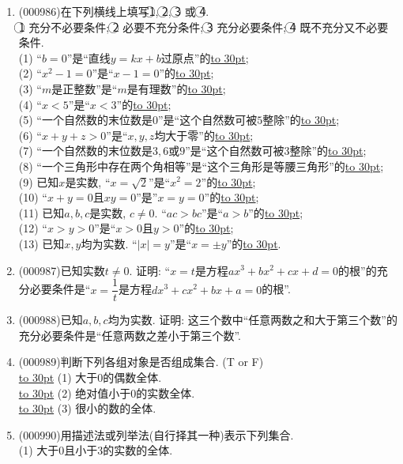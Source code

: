 \documentclass[10pt,a4paper]{article}
\newcommand{\blank}[1]{\underline{\hbox to #1pt{}}}
\begin{document}
\begin{enumerate}[1.]
逆否命题: \blank{250}; 逆否命题的真值: \blank{30}.
\item {\tiny (000986)}在下列横线上填写\textcircled{1}, \textcircled{2}, \textcircled{3} 或 \textcircled{4}.\\ 
\textcircled{1} 充分不必要条件; \textcircled{2} 必要不充分条件; \textcircled{3} 充分必要条件; \textcircled{4} 既不充分又不必要条件.\\ 
(1) ``$b=0$''是``直线$y=kx+b$过原点''的\blank{30};\\ 
(2) ``$x^2-1=0$''是``$x-1=0$''的\blank{30};\\ 
(3) ``$m$是正整数''是``$m$是有理数''的\blank{30};\\ 
(4) ``$x<5$''是``$x<3$''的\blank{30};\\ 
(5) ``一个自然数的末位数是$0$''是``这个自然数可被$5$整除''的\blank{30};\\ 
(6) ``$x+y+z>0$''是``$x,y,z$均大于零''的\blank{30};\\ 
(7) ``一个自然数的末位数是$3,6$或$9$''是``这个自然数可被$3$整除''的\blank{30};\\ 
(8) ``一个三角形中存在两个角相等''是``这个三角形是等腰三角形''的\blank{30};\\ 
(9) 已知$x$是实数, ``$x=\sqrt{2}$''是``$x^2=2$''的\blank{30};\\ 
(10) ``$x+y=0$且$xy=0$''是''$x=y=0$''的\blank{30};\\ 
(11) 已知$a,b,c$是实数, $c \ne 0$. ``$ac>bc$''是``$a>b$''的\blank{30};\\ 
(12) ``$x>y>0$''是``$x>0$且$y>0$''的\blank{30};\\ 
(13) 已知$x,y$均为实数. ``$|x|=y$''是``$x=\pm y$''的\blank{30}.
\item {\tiny (000987)}已知实数$t\ne 0$. 证明: ``$x=t$是方程$a x^3+b x^2+cx+d=0$的根''的充分必要条件是``$x=\dfrac{1}{t}$是方程$d x^3+c x^2+ b x+a=0$的根''.
\item {\tiny (000988)}已知$a,b,c$均为实数. 证明: 这三个数中``任意两数之和大于第三个数''的充分必要条件是``任意两数之差小于第三个数''.
\item {\tiny (000989)}判断下列各组对象是否组成集合. (T or F)\\ 
\blank{30} (1) 大于$0$的偶数全体.\\ 
\blank{30} (2) 绝对值小于$0$的实数全体.\\ 
\blank{30} (3) 很小的数的全体.
\item {\tiny (000990)}用描述法或列举法(自行择其一种)表示下列集合.\\ 
(1) 大于$0$且小于$3$的实数的全体.\\ 

\end{enumerate}
\end{document}
